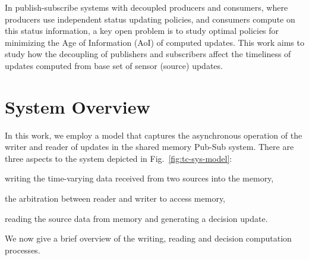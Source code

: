 \documentclass[conference, 10pt]{IEEEtran}
\begin{document}
In publish-subscribe systems with decoupled producers and consumers, where producers use independent status updating policies, and consumers compute on this status information, a key open problem is to study optimal policies for minimizing the Age of Information (AoI) of computed updates. This work aims to study how the decoupling of publishers and subscribers affect the
timeliness of updates computed 
from base set of sensor (source) updates.




\section{System Overview}
\label{sec:sysmodel}

In this work, we employ a model that captures  the asynchronous operation of the writer and reader of updates in the shared memory Pub-Sub system. 
There are three aspects to the system depicted in Fig.~\ref{fig:tc-sys-model}: 
\begin{enumerate*}
    \item writing the time-varying data received from two sources into the memory,
    \item the arbitration between reader and writer to access memory,
    \item reading the source data from memory and generating a decision update.  
\end{enumerate*}
We now give a brief overview of the writing, reading and decision computation processes.
\end{document}

